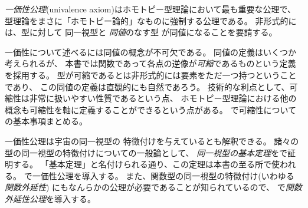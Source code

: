 \documentclass[index]{subfiles}
\begin{document}

\emph{一価性公理}(univalence axiom)はホモトピー型理論において最も重要な公理で、
型理論をまさに「ホモトピー論的」なものに強制する公理である。
非形式的には、型に対して
同一視型と
\emph{同値}のなす型
が同値になることを要請する。

一価性について述べるには同値の概念が不可欠である。
同値の定義はいくつか考えられるが、
本書では関数であって各点の逆像が\emph{可縮}であるものという定義を採用する。
型が可縮であるとは非形式的には要素をただ一つ持つということであり、
この同値の定義は直観的にも自然であろう。
技術的な利点として、可縮性は非常に扱いやすい性質であるという点、
ホモトピー型理論における他の概念も可縮性を軸に定義することができるという点がある。
で可縮性についての基本事項まとめる。

一価性公理は宇宙の同一視型の
特徴付けを与えているとも解釈できる。
諸々の型の同一視型の特徴付けについての一般論として、
\emph{同一視型の基本定理}をで証明する。
「基本定理」と名付けられる通り、この定理は本書の至る所で使われる。
で一価性公理を導入する。
また、関数型の同一視型の特徴付け(いわゆる\emph{関数外延性})
にもなんらかの公理が必要であることが知られているので、
で\emph{関数外延性公理}を導入する。

\begin{mySubsections}
  
  
  
  
  
  
\end{mySubsections}
\end{document}
